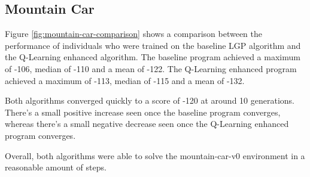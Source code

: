 \documentclass[12pt, final]{dalcsthesis}
\begin{document}
\subsection{Mountain Car}

Figure \ref{fig:mountain-car-comparison} shows a comparison between the performance of individuals who were trained on the baseline LGP algorithm and the Q-Learning enhanced algorithm. The baseline program achieved a maximum of
-106, median of -110 and a mean of -122. The Q-Learning enhanced program achieved a maximum of -113, median of -115 and a mean of -132.

Both algorithms converged quickly to a score of -120 at around 10 generations.
There's a small positive increase seen once the baseline program converges, whereas there's a small negative decrease seen once the Q-Learning enhanced program converges.

Overall, both algorithms were able to solve the mountain-car-v0 environment in a reasonable amount of steps.
\end{document}
